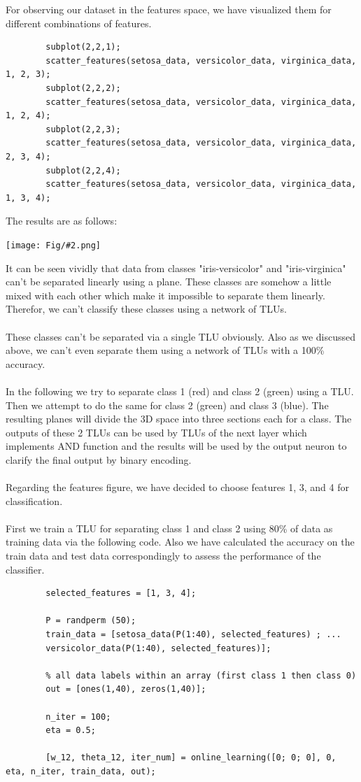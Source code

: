 \documentclass[]{article}
\newcommand{\pict}[2]{\begin{center}
		\texttt{[image: Fig/\#2.png]}
\end{center}}
\begin{document}
	For observing our dataset in the features space, we have visualized them for different combinations of features. 
	\begin{lstlisting}
		subplot(2,2,1);
		scatter_features(setosa_data, versicolor_data, virginica_data, 1, 2, 3);
		subplot(2,2,2);
		scatter_features(setosa_data, versicolor_data, virginica_data, 1, 2, 4);
		subplot(2,2,3);
		scatter_features(setosa_data, versicolor_data, virginica_data, 2, 3, 4);
		subplot(2,2,4);
		scatter_features(setosa_data, versicolor_data, virginica_data, 1, 3, 4);
	\end{lstlisting}
	The results are as follows:
	\pict{1}{Q2_F9}
	It can be seen vividly that data from classes "iris-versicolor" and "iris-virginica" can't be separated linearly using a plane. These classes are somehow a little mixed with each other which make it impossible to separate them linearly. Therefor, we can't classify these classes using a network of TLUs.\\\\
	These classes can't be separated via a single TLU obviously. Also as we discussed above, we can't even separate them using a network of TLUs with a 100\% accuracy.\\\\
	In the following we try to separate class 1 (red) and class 2 (green) using a TLU. Then we attempt to do the same for class 2 (green) and class 3 (blue). The resulting planes will divide the 3D space into three sections each for a class. The outputs of these 2 TLUs can be used by TLUs of the next layer which implements AND function and the results will be used by the output neuron to clarify the final output by binary encoding.\\\\
	Regarding the features figure, we have decided to choose features 1, 3, and 4 for classification.\\\\
	First we train a TLU for separating class 1 and class 2 using 80\% of data as training data via the following code. Also we have calculated the accuracy on the train data and test data correspondingly to assess the performance of the classifier.
	\begin{lstlisting}
		selected_features = [1, 3, 4];
		
		P = randperm (50);
		train_data = [setosa_data(P(1:40), selected_features) ; ...
		versicolor_data(P(1:40), selected_features)];
		
		% all data labels within an array (first class 1 then class 0)
		out = [ones(1,40), zeros(1,40)];
		
		n_iter = 100;
		eta = 0.5;
		
		[w_12, theta_12, iter_num] = online_learning([0; 0; 0], 0, eta, n_iter, train_data, out);
		
	\end{lstlisting}
\end{document}

